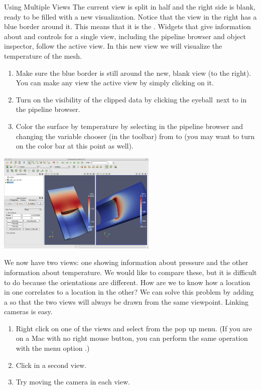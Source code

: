 \begin{exercise}{Using Multiple Views}
  The current view is split in half and the right side is blank, ready to
  be filled with a new visualization.  Notice that the view in the right
  has a blue border around it.  This means that it is the .  Widgets that give information about and controls for a single
  view, including the pipeline browser and object inspector, follow the
  active view.  In this new view we will visualize the temperature of the
  mesh.

  \begin{enumerate}
  \item Make sure the blue border is still around the new, blank view (to
    the right).  You can make any view the active view by simply clicking
    on it.
  \item Turn on the visibility of the clipped data by clicking the
    eyeball~\eyeballg next to  in the pipeline browser.
  \item Color the surface by temperature by selecting  in the
    pipeline browser and changing the variable chooser (in the toolbar)
    from  to  (you may want to turn on the color
    bar at this point as well).
    \savecounter
  \end{enumerate}

  \begin{inlinefig}
    \includegraphics[width=3in]{images/SplitView2}
  \end{inlinefig}

  We now have two views: one showing information about pressure and the
  other information about temperature.  We would like to compare these, but
  it is difficult to do because the orientations are different.  How are we
  to know how a location in one correlates to a location in the other?  We
  can solve this problem by adding a  so that the two
  views will always be drawn from the same viewpoint.  Linking cameras is
  easy.

  \begin{enumerate}
    \restorecounter
  \item Right click on one of the views and select 
    from the pop up menu. (If you are on a Mac with no right mouse button,
    you can perform the same operation with the menu option  \ra
    .)
  \item Click in a second view.
  \item Try moving the camera in each view.
  \end{enumerate}


\end{exercise}
